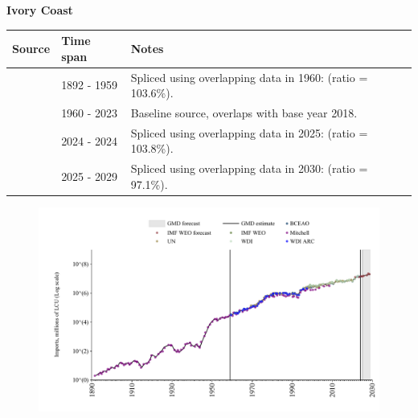 \documentclass[12pt,a4paper,landscape]{article}
\begin{document}
\begin{adjustbox}{max totalsize={\paperwidth}{\paperheight},center}
\begin{minipage}[t][\textheight][t]{\textwidth}
\vspace*{0.5cm}
{}
\begin{center}
{\Large\bfseries Ivory Coast}
\end{center}
\vspace{0.5cm}
\begin{table}[H]
\centering
\small
\begin{tabular}{|l|l|l|}
\hline
\textbf{Source} & \textbf{Time span} & \textbf{Notes} \\
\hline
\rowcolor{white}\cite{Mitchell}& 1892 - 1959 &Spliced using overlapping data in 1960: (ratio = 103.6\%).\\
\rowcolor{lightgray}\cite{WDI}& 1960 - 2023 &Baseline source, overlaps with base year 2018.\\
\rowcolor{white}\cite{BCEAO}& 2024 - 2024 &Spliced using overlapping data in 2025: (ratio = 103.8\%).\\
\rowcolor{lightgray}\cite{IMF_WEO_forecast}& 2025 - 2029 &Spliced using overlapping data in 2030: (ratio = 97.1\%).\\
\hline
\end{tabular}
\end{table}
\begin{figure}[H]
\centering
\includegraphics[width=\textwidth,height=0.6\textheight,keepaspectratio]{graphs/CIV_imports.pdf}
\end{figure}
\end{minipage}
\end{adjustbox}
\end{document}

